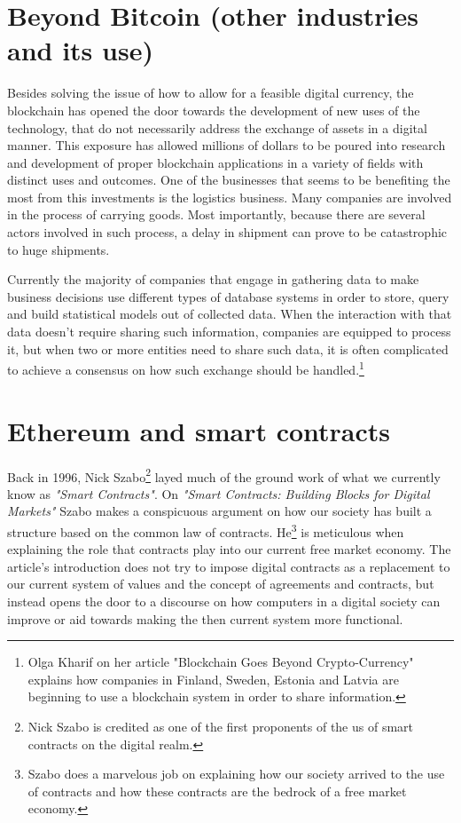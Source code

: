 \documentclass[submission,copyright,creativecommons]{eptcs}
\begin{document}
\section{Beyond Bitcoin (other industries and its use)}
Besides solving the issue of how to allow for a feasible digital currency, the blockchain has opened the door towards the development of new uses of the technology, that do not necessarily address the exchange of assets in a digital manner.  This exposure has allowed millions of dollars to be poured into research and development of proper blockchain applications in a variety of fields with distinct uses and outcomes.
One of the businesses that seems to be benefiting the most from this investments is the logistics business. Many companies are involved in the process of carrying goods. Most importantly, because there are several actors involved in such process, a delay in shipment can prove to be catastrophic to huge shipments.  

Currently the majority of companies that engage in gathering data to make business decisions use different types of database systems in order to store, query and build statistical models out of collected data.  When the interaction with that data doesn't require sharing such information, companies are equipped to process it, but when two or more entities\cite{BlockchainGoesCryptoCurrency2016} need to share such data, it is often complicated to achieve a consensus on how such exchange should be handled.\footnote{Olga Kharif on her article "Blockchain Goes Beyond Crypto-Currency" explains how companies in Finland, Sweden, Estonia and Latvia are beginning to use a blockchain system in order to share information.}

\section{Ethereum and smart contracts}
Back in 1996, Nick Szabo\footnote{Nick Szabo is credited as one of the first proponents of the us of smart contracts on the digital realm.} layed much of the ground work of what we currently know as \textit{"Smart Contracts"}.  On \textit{"Smart Contracts: Building Blocks for Digital Markets"}\cite{NickSzaboSmart} Szabo makes a conspicuous argument on how our society has built a structure based on the common law of contracts.  He\footnote{Szabo does a marvelous job on explaining how our society arrived to the use of contracts and how these contracts are the bedrock of a free market economy.} is meticulous when explaining the role that contracts play into our current free market economy.  The article's introduction does not try to impose digital contracts as a replacement to our current system of values and the concept of agreements and contracts, but instead opens the door to a discourse on how computers in a digital society can improve or aid towards making the then current system more functional.
\end{document}
